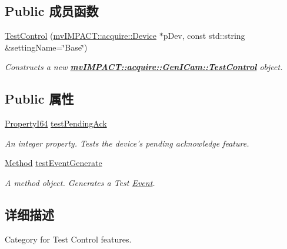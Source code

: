 \subsection*{Public 成员函数}
\begin{DoxyCompactItemize}
\item 
\hyperlink{classmv_i_m_p_a_c_t_1_1acquire_1_1_gen_i_cam_1_1_test_control_afd41927585e38b0b140faa80b78e6a55}{Test\+Control} (\hyperlink{classmv_i_m_p_a_c_t_1_1acquire_1_1_device}{mv\+I\+M\+P\+A\+C\+T\+::acquire\+::\+Device} $\ast$p\+Dev, const std\+::string \&setting\+Name=\char`\"{}Base\char`\"{})
\begin{DoxyCompactList}\small\item\em Constructs a new {\bfseries \hyperlink{classmv_i_m_p_a_c_t_1_1acquire_1_1_gen_i_cam_1_1_test_control}{mv\+I\+M\+P\+A\+C\+T\+::acquire\+::\+Gen\+I\+Cam\+::\+Test\+Control}} object. \end{DoxyCompactList}\end{DoxyCompactItemize}
\subsection*{Public 属性}
\begin{DoxyCompactItemize}
\item 
\hyperlink{group___common_interface_ga81749b2696755513663492664a18a893}{Property\+I64} \hyperlink{classmv_i_m_p_a_c_t_1_1acquire_1_1_gen_i_cam_1_1_test_control_aab450f8b92bc80b59be8a60c364e0695}{test\+Pending\+Ack}
\begin{DoxyCompactList}\small\item\em An integer property. Tests the device's pending acknowledge feature. \end{DoxyCompactList}\item 
\hyperlink{classmv_i_m_p_a_c_t_1_1acquire_1_1_method}{Method} \hyperlink{classmv_i_m_p_a_c_t_1_1acquire_1_1_gen_i_cam_1_1_test_control_a38ed61ff2ddbc080ea27776b3b4da928}{test\+Event\+Generate}
\begin{DoxyCompactList}\small\item\em A method object. Generates a Test \hyperlink{classmv_i_m_p_a_c_t_1_1acquire_1_1_event}{Event}. \end{DoxyCompactList}\end{DoxyCompactItemize}


\subsection{详细描述}
Category for Test Control features. 

